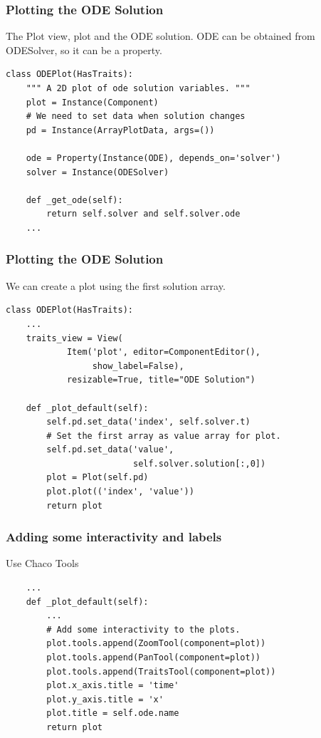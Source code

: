 \documentclass[14pt,compress]{beamer}
\newcounter{time}
\begin{document}
\begin{frame}
\frametitle{Plotting the ODE Solution}

The Plot view, plot and the ODE solution. ODE can be obtained from ODESolver,
so it can be a property.

\footnotesize
\begin{lstlisting}
class ODEPlot(HasTraits):
    """ A 2D plot of ode solution variables. """
    plot = Instance(Component)
    # We need to set data when solution changes
    pd = Instance(ArrayPlotData, args=())

    ode = Property(Instance(ODE), depends_on='solver')
    solver = Instance(ODESolver)

    def _get_ode(self):
        return self.solver and self.solver.ode
    ...
\end{lstlisting}
\end{frame}

\begin{frame}
\frametitle{Plotting the ODE Solution}
\footnotesize
We can create a plot using the first solution array.
\begin{lstlisting}
class ODEPlot(HasTraits):
    ...
    traits_view = View(
            Item('plot', editor=ComponentEditor(),
                 show_label=False),
            resizable=True, title="ODE Solution")

    def _plot_default(self):
        self.pd.set_data('index', self.solver.t)
        # Set the first array as value array for plot.
        self.pd.set_data('value',
                         self.solver.solution[:,0])
        plot = Plot(self.pd)
        plot.plot(('index', 'value'))
        return plot
\end{lstlisting}
\end{frame}

\begin{frame}
\frametitle{Adding some interactivity and labels}
Use Chaco Tools
\footnotesize
\begin{lstlisting}
    ...
    def _plot_default(self):
        ...
        # Add some interactivity to the plots.
        plot.tools.append(ZoomTool(component=plot))
        plot.tools.append(PanTool(component=plot))
        plot.tools.append(TraitsTool(component=plot))
        plot.x_axis.title = 'time'
        plot.y_axis.title = 'x'
        plot.title = self.ode.name
        return plot
\end{lstlisting}
\end{frame}
\end{document}
